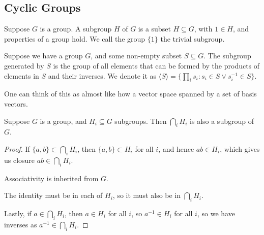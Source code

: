 \subsection{Cyclic Groups}

\begin{definition}
    Suppose \(G\) is a group.
    A subgroup \(H\) of \(G\) is a subset \(H \subseteq G\),
    with \(1 \in H\), and properties of a group hold.
    We call the group \(\{1\}\) the trivial subgroup.
\end{definition}

\begin{definition}
    Suppose we have a group \(G\),
    and some non-empty subset \(S \subseteq G\).
    The subgroup generated by \(S\)
    is the group of all elements that can be formed
    by the products of elements in \(S\) and their inverses.
    We denote it as
    \(\langle S \rangle = \{\prod_i s_i : s_i \in S \lor s_i^{-1} \in S\}\).
\end{definition}
\begin{remark}
    One can think of this as almost like how a vector space
    spanned by a set of basis vectors.
\end{remark}

\begin{lemma}\label{lem:intersection-subgroup}
    Suppose \(G\) is a group,
    and \(H_i \subseteq G\) subgroups.
    Then \(\bigcap_i H_i\) is also a subgroup of \(G\).
\end{lemma}
\begin{proof}
    If \(\{a,b\} \subset \bigcap_i H_i\),
    then \(\{a,b\} \subset H_i\) for all \(i\),
    and hence \(ab \in H_i\),
    which gives us closure \(ab \in \bigcap_i H_i\).

    Associativity is inherited from \(G\).

    The identity must be in each of \(H_i\),
    so it must also be in \(\bigcap_i H_i\).

    Lastly, if \(a \in \bigcap_i H_i\),
    then \(a \in H_i\) for all \(i\),
    so \(a^{-1} \in H_i\) for all \(i\),
    so we have inverses as \(a^{-1} \in \bigcap_i H_i\).
\end{proof}

